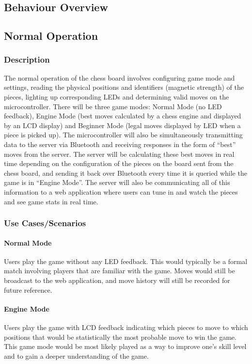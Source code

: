 \documentclass[12pt]{article}
\begin{document}
\subsection{Behaviour Overview}{


\subsection{Normal Operation}
\subsubsection{Description}{
    The normal operation of the chess board involves configuring game mode and settings, reading the physical positions and identifiers (magnetic strength) of the pieces, 
    lighting up corresponding LEDs and determining valid moves on the microcontroller. There will be three game modes: Normal Mode (no LED feedback), Engine Mode (best moves 
    calculated by a chess engine and displayed by an LCD display) and Beginner Mode (legal moves displayed by LED when a piece is picked up). The microcontroller will also be 
    simultaneously transmitting data to the server via Bluetooth and receiving responses in the form of ``best'' moves from the server. The server will be calculating these 
    best moves in real time depending on the configuration of the pieces on the board sent from the chess board, and sending it back over Bluetooth every time it is queried
    while the game is in ``Engine Mode''. The server will also be communicating all of this information to a web application where users can tune in and watch the pieces and see
    game stats in real time.
}

\subsubsection{Use Cases/Scenarios}{
    
    \paragraph{Normal Mode}{
        Users play the game without any LED feedback. This would typically be a formal match involving players that are familiar with the game. Moves would still be broadcast to the
        web application, and move history will still be recorded for future reference.
    }
        
    \paragraph{Engine Mode}{
        Users play the game with LCD feedback indicating which pieces to move to which positions that would be statistically the most probable move to win the game. This game mode would
        be most likely played as a way to improve one's skill level and to gain a deeper understanding of the game.
    }
    
}}
\end{document}
